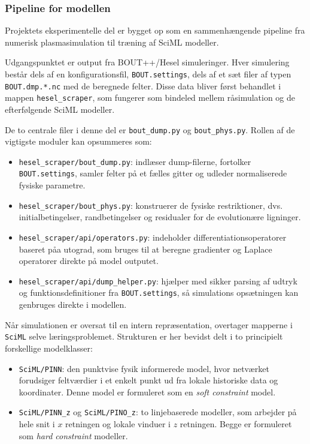 \subsubsection{Pipeline for modellen}
Projektets eksperimentelle del er bygget op som en sammenhængende pipeline fra numerisk plasmasimulation til træning af SciML modeller.

Udgangspunktet er output fra BOUT++/Hesel  simuleringer. Hver simulering består dels af en konfigurationsfil, \texttt{BOUT.settings}, dels af et sæt filer af typen \texttt{BOUT.dmp.*.nc}
med de beregnede felter. Disse data bliver først behandlet i mappen \texttt{hesel\_scraper}, som fungerer som bindeled mellem råsimulation og de efterfølgende SciML modeller.

De to centrale filer i denne del er \texttt{bout\_dump.py} og \texttt{bout\_phys.py}. Rollen af de vigtigste moduler kan opsummeres som:
\begin{itemize}
    \item \texttt{hesel\_scraper/bout\_dump.py}: indlæser dump-filerne, fortolker \texttt{BOUT.settings}, samler felter på et fælles gitter og udleder normaliserede fysiske parametre.
    \item \texttt{hesel\_scraper/bout\_phys.py}: konstruerer de fysiske restriktioner, dvs. initialbetingelser, randbetingelser og residualer for de evolutionære ligninger.
    \item \texttt{hesel\_scraper/api/operators.py}: indeholder differentiationsoperatorer baseret påa utograd, som bruges til at beregne gradienter og Laplace operatorer direkte på model outputet.
    \item \texttt{hesel\_scraper/api/dump\_helper.py}: hjælper med sikker parsing af udtryk og funktionsdefinitioner fra \texttt{BOUT.settings}, så simulations opsætningen kan genbruges direkte i modellen.
\end{itemize}

Når simulationen er oversat til en intern repræsentation, overtager mapperne i \texttt{SciML} selve læringsproblemet. Strukturen er her bevidst delt i to principielt forskellige modelklasser:
\begin{itemize}
    \item \texttt{SciML/PINN}: den punktvise fysik informerede model, hvor netværket forudsiger feltværdier i et enkelt punkt ud fra lokale historiske data og koordinater. Denne model er formuleret som en \emph{soft constraint} model.
    \item \texttt{SciML/PINN\_z} og \texttt{SciML/PINO\_z}: to linjebaserede modeller, som arbejder på hele snit i \(x\) retningen og lokale vinduer i \(z\) retningen. Begge er formuleret som \emph{hard constraint} modeller.
\end{itemize}

